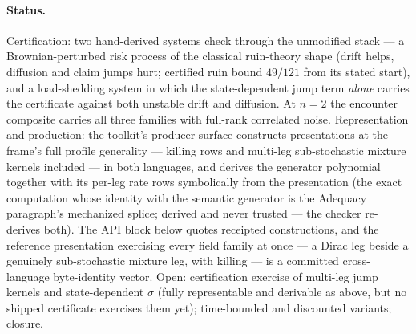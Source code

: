 \paragraph{Status.} Certification: two hand-derived systems check
through the unmodified stack --- a Brownian-perturbed risk process of
the classical ruin-theory shape (drift helps, diffusion and claim
jumps hurt; certified ruin bound $49/121$ from its stated start), and
a load-shedding system in which the state-dependent jump term
\emph{alone} carries the certificate against both unstable drift and
diffusion. At $n = 2$ the encounter composite carries all three
families with full-rank correlated noise. Representation and
production: the toolkit's producer surface constructs presentations
at the frame's full profile generality --- killing rows and multi-leg
sub-stochastic mixture kernels included --- in both languages, and
derives the generator polynomial together with its per-leg rate rows
symbolically from the presentation (the exact computation whose
identity with the semantic generator is the Adequacy paragraph's
mechanized splice; derived and never trusted --- the checker
re-derives both). The API block below quotes receipted constructions,
and the reference presentation exercising every field family at once
--- a Dirac leg beside a genuinely sub-stochastic mixture leg, with
killing --- is a committed cross-language byte-identity vector. Open:
certification exercise of multi-leg jump kernels and state-dependent
$\sigma$ (fully representable and derivable as above, but no shipped
certificate exercises them yet); time-bounded and discounted
variants; closure.



